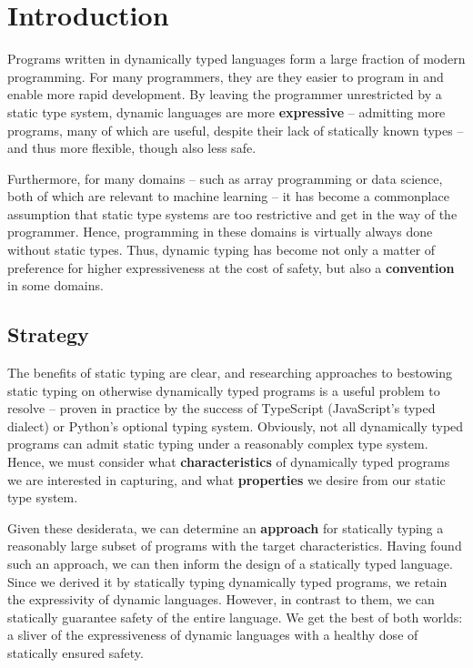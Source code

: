 \chapter{Introduction}

Programs written in dynamically typed languages form a large fraction of modern programming. 
For many programmers, they are they easier to program in and enable more rapid development.
By leaving the programmer unrestricted by a static type system, dynamic languages are more \textbf{expressive} -- admitting more programs, many of which are useful, despite their lack of statically known types -- and thus more flexible, though also less safe.

Furthermore, for many domains -- such as array programming or data science, both of which are relevant to machine learning -- it has become a commonplace assumption that static type systems are too restrictive and get in the way of the programmer. Hence, programming in these domains is virtually always done without static types.
Thus, dynamic typing has become not only a matter of preference for higher expressiveness at the cost of safety, but also a \textbf{convention} in some domains.

\section{Strategy}

The benefits of static typing are clear, and researching approaches to bestowing static typing on otherwise dynamically typed programs is a useful problem to resolve -- proven in practice by the success of TypeScript (JavaScript's typed dialect) or Python's optional typing system. 
Obviously, not all dynamically typed programs can admit static typing under a reasonably complex type system. 
Hence, we must consider what \textbf{characteristics} of dynamically typed programs we are interested in capturing, and what \textbf{properties} we desire from our static type system. 

Given these desiderata, we can determine an \textbf{approach} for statically typing a reasonably large subset of programs with the target characteristics.
Having found such an approach, we can then inform the design of a statically typed language. 
Since we derived it by statically typing dynamically typed programs, we retain the expressivity of dynamic languages. However, in contrast to them, we can statically guarantee safety of the entire language.
We get the best of both worlds: a sliver of the expressiveness of dynamic languages with a healthy dose of statically ensured safety.

